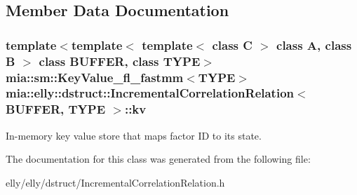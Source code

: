 \subsection{Member Data Documentation}
\hypertarget{classmia_1_1elly_1_1dstruct_1_1_incremental_correlation_relation_a1fc214b8ab12ac13196aaedd6f629ee2}{
\subsubsection[{kv}]{\setlength{\rightskip}{0pt plus 5cm}template$<$template$<$ template$<$ class C $>$ class A, class B $>$ class B\-U\-F\-F\-E\-R, class T\-Y\-P\-E$>$ {\bf mia\-::sm\-::\-Key\-Value\-\_\-fl\-\_\-fastmm}$<$T\-Y\-P\-E$>$ {\bf mia\-::elly\-::dstruct\-::\-Incremental\-Correlation\-Relation}$<$ B\-U\-F\-F\-E\-R, T\-Y\-P\-E $>$\-::kv}}\label{classmia_1_1elly_1_1dstruct_1_1_incremental_correlation_relation_a1fc214b8ab12ac13196aaedd6f629ee2}
In-\/memory key value store that maps factor I\-D to its state. 

The documentation for this class was generated from the following file\-:\begin{DoxyCompactItemize}
\item 
elly/elly/dstruct/Incremental\-Correlation\-Relation.\-h\end{DoxyCompactItemize}
